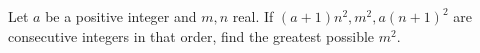 Let $a$ be a positive integer and $m,n$ real. If $(a+1)n^2,m^2,a(n+1)^2$ are consecutive integers in that order, find the greatest possible $m^2$.
